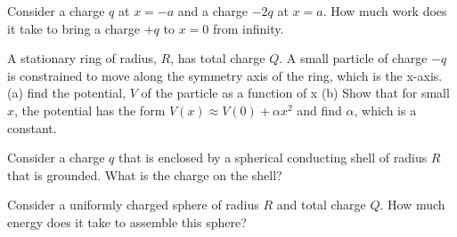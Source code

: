 \documentclass[12pt]{article}
\begin{document}
\pagestyle{empty}
\noindent Consider a charge $q$ at $x=-a$ and a charge $-2q$ at $x=a$.  How much work does it take to bring a charge $+q$ to $x=0$ from infinity.  

\newpage
\noindent A stationary ring of radius, $R$, has total charge $Q$.  A small particle of charge $-q$ is constrained to move along the symmetry axis of the ring, which is the x-axis.  (a) find the potential, $V$ of the particle as a function of x (b) Show that for small $x$, the potential has the form $V(x) \approx V(0) + \alpha x^2$ and find $\alpha$, which is a constant. 

\newpage
\noindent Consider a charge $q$ that is enclosed by a spherical conducting shell of radius $R$ that is grounded.  What is the charge on the shell? 


\newpage 
\noindent Consider a uniformly charged sphere of radius $R$ and total charge $Q$.  How much energy does it take to assemble this sphere?   
\end{document}
